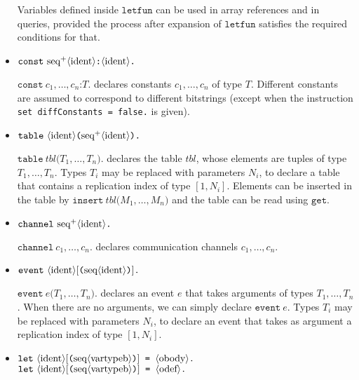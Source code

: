 \begin{itemize}
  Variables defined inside $\texttt{letfun}$ can be used in array references
  and in queries, provided the process after expansion of $\texttt{letfun}$
  satisfies the required conditions for that.

\item $\texttt{const}\ \neseq{ident}\texttt{:}\nonterm{ident}\texttt{.}$

$\texttt{const}\ c_1, \ldots, c_n\texttt{:}T\texttt{.}$ declares constants
$c_1, \ldots, c_n$ of type $T$.
Different constants are assumed to correspond to different bitstrings
(except when the instruction \texttt{set diffConstants = false.} is
given).

\item $\texttt{table}\ \nonterm{ident}\texttt{(}\neseq{ident}\texttt{).}$

$\texttt{table}\ \mathit{tbl}\texttt{(}T_1, \ldots, T_n\texttt{).}$
declares the table $\mathit{tbl}$, whose elements are tuples of
type $T_1, \ldots, T_n$. Types $T_i$ may be replaced with
parameters $N_i$, to declare a table that contains
a replication index of type $[1,N_i]$. Elements can be inserted in the table
by $\texttt{insert}\ \mathit{tbl}\texttt{(}M_1, \ldots, M_n\texttt{)}$
and the table can be read using $\texttt{get}$.

\ifchannels
\item $\texttt{channel}\ \neseq{ident}\texttt{.}$

$\texttt{channel}\ c_1, \ldots, c_n\texttt{.}$ declares communication channels
$c_1, \ldots, c_n$.
\fi

\item $\texttt{event}\ \nonterm{ident}[\texttt{(}\seq{ident}\texttt{)}]\texttt{.}$

$\texttt{event}\ e\texttt{(}T_1, \ldots, T_n\texttt{)}\texttt{.}$
declares an event $e$ that takes arguments of types $T_1, \ldots, T_n$.
When there are no arguments, we can simply declare 
$\texttt{event}\ e\texttt{.}$ Types $T_i$ may be replaced with
parameters $N_i$, to declare an event that takes as argument
a replication index of type $[1,N_i]$.


\item $\texttt{let}\ \nonterm{ident}[\texttt{(}\seq{vartypeb}\texttt{)}]\texttt{ = }\oprocess\texttt{.}$\\
$\texttt{let}\ \nonterm{ident}[\texttt{(}\seq{vartypeb}\texttt{)}]\texttt{ = }\iprocess\texttt{.}$


\end{itemize}

